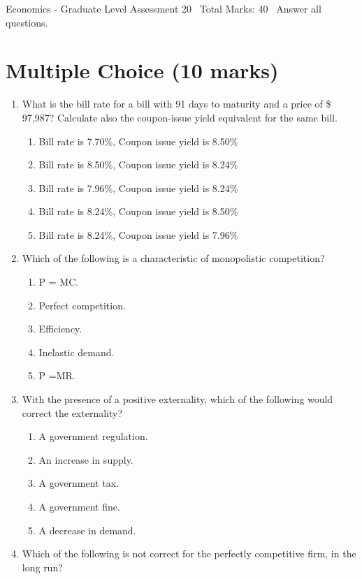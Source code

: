 \documentclass[12pt]{article}
\begin{document}
\begin{center}
Economics - Graduate Level Assessment 20 \
Total Marks: 40 \
Answer all questions.
\end{center}

\section*{Multiple Choice (10 marks)}
\begin{enumerate}[label=\arabic*.]
\item What is the bill rate for a bill with 91 days to maturity and a price of \$ 97,987? Calculate also the coupon-issue yield equivalent for the same bill.
\begin{enumerate}[label=(\alph*)]
    \item Bill rate is 7.70\%, Coupon issue yield is 8.50\%
    \item Bill rate is 8.50\%, Coupon issue yield is 8.24\%
    \item Bill rate is 7.96\%, Coupon issue yield is 8.24\%
    \item Bill rate is 8.24\%, Coupon issue yield is 8.50\%
    \item Bill rate is 8.24\%, Coupon issue yield is 7.96\%
\end{enumerate}
\item Which of the following is a characteristic of monopolistic competition?
\begin{enumerate}[label=(\alph*)]
    \item P = MC.
    \item Perfect competition.
    \item Efficiency.
    \item Inelastic demand.
    \item P =MR.
\end{enumerate}
\item With the presence of a positive externality, which of the following would correct the externality?
\begin{enumerate}[label=(\alph*)]
    \item A government regulation.
    \item An increase in supply.
    \item A government tax.
    \item A government fine.
    \item A decrease in demand.
\end{enumerate}
\item Which of the following is not correct for the perfectly competitive firm, in the long run?

\end{enumerate}
\end{document}
